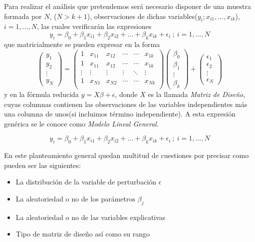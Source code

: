 \documentclass[10pt,a4paper]{book}
\begin{document}
Para realizar el análisis que pretendemos será necesario disponer de una muestra formada por $N$, ($N > k + 1$), observaciones de dichas variables($y_i;x_{i1},...,x_{ik}$), $i=1,...,N$, las cuales verificarán las expresiones $$y_i = \beta_0 + \beta_1x_{i1} + \beta_2x_{i2} +...+ \beta_kx_{ik} + \epsilon_i\ ;\ i=1,...,N$$ que matricialmente se pueden expresar en la forma $$ \left( \begin{array}{c}
y_1\\
y_2\\
\vdots\\
y_N \end{array} \right) = 
\left( \begin{array}{cccccc}
1 & x_{11} & x_{12} & \cdots & \cdots & x_{1k} \\
1 & x_{11} & x_{12} & \cdots & \cdots & x_{1k} \\
\vdots & \vdots & \vdots & \vdots & \ddots & \vdots \\
1 & x_{N1} & x_{N2} & \cdots & \cdots & x_{Nk} \\
\end{array} \right) 
\left( \begin{array}{c}
\beta_0\\
\beta_1\\
\vdots\\
\beta_k \end{array} \right) + 
\left( \begin{array}{c}
\epsilon_1\\
\epsilon_2\\
\vdots\\
\epsilon_N \end{array} \right)$$ y en la fórmula reducida $y = X\beta + \epsilon$, donde $X$ es la llamada \textit{Matriz de Diseño}, cuyas columnas contienen las observaciones de las variables independientes más una columna de unos(si incluimos término independiente). A esta expresión genérica se le conoce como \emph{Modelo Lineal General}.

$$y_i = \beta_0 + \beta_1x_{i1} + \beta_2x_{i2} +...+ \beta_kx_{ik} + \epsilon_i\ ;\ i=1,...,N$$

En este planteamiento general quedan multitud de cuestiones por precisar como pueden ser las siguientes:
\begin{itemize}
\item La distribución de la variable de perturbación $\epsilon$
\item La aleatoriedad o no de los parámetros $\beta_j$
\item La aleatoriedad o no de las variables explicativas
\item Tipo de matriz de diseño así como su rango
\end{itemize}
\end{document}

